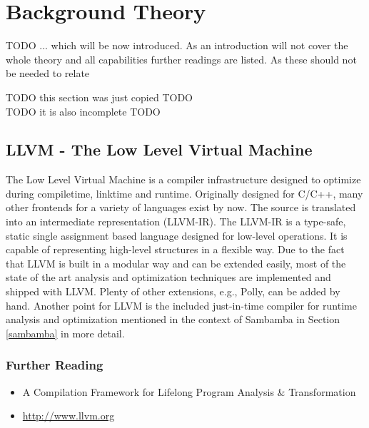 
\chapter{Background Theory} %
\label{Chapter2}

TODO ...  which will be now introduced. 
As an introduction will not cover the whole theory and all capabilities 
further readings are listed. As these should not be needed to relate 

\begin{center}
TODO this section was just copied TODO \\
TODO it is also incomplete TODO 
\end{center}

\section{LLVM - The Low Level Virtual Machine}
\label{LLVM}
The Low Level Virtual Machine is a compiler infrastructure designed to optimize
during compiletime, linktime and runtime. Originally designed for C/C++, 
many other frontends for a variety of languages exist by now. The source is 
translated into an intermediate representation (LLVM-IR). 
The LLVM-IR is a type-safe, static single
assignment based language designed for low-level operations. It is capable of 
representing high-level structures in a flexible way.
Due to the fact that LLVM is built in a modular 
way and can be extended easily, most of the state of the art analysis and
optimization techniques are implemented and shipped with LLVM. Plenty of other
extensions, e.g., Polly, can be added by hand. 
Another point for LLVM is the 
included just-in-time compiler for runtime analysis and optimization mentioned
in the context of Sambamba in Section \ref{sambamba} in more detail.

\subsection*{Further Reading}

\begin{itemize}
  \item A Compilation Framework for Lifelong Program Analysis \& Transformation
    \cite{LLVM:CGO04}  
  \item \url{http://www.llvm.org} \nocite{LLVM:Online}
\end{itemize}


